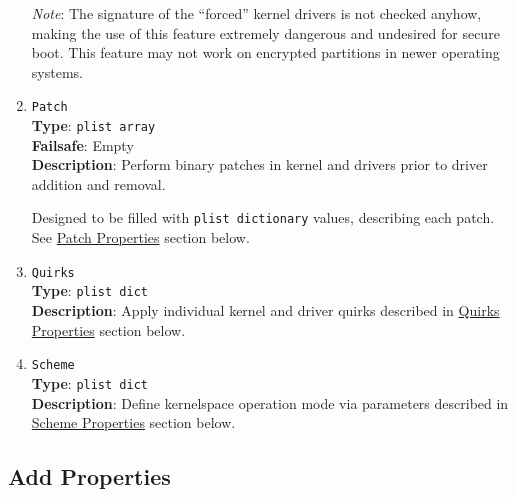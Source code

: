 \documentclass[]{article}
\begin{document}
\begin{enumerate}
  \emph{Note}: The signature of the ``forced'' kernel drivers is not checked anyhow,
  making the use of this feature extremely dangerous and undesired for secure boot.
  This feature may not work on encrypted partitions in newer operating systems.

\item
  \texttt{Patch}\\
  \textbf{Type}: \texttt{plist\ array}\\
  \textbf{Failsafe}: Empty\\
  \textbf{Description}: Perform binary patches in kernel and drivers prior to
  driver addition and removal.

  Designed to be filled with \texttt{plist\ dictionary} values, describing each
  patch. See \hyperref[kernelpropspatch]{Patch Properties} section below.

\item
  \texttt{Quirks}\\
  \textbf{Type}: \texttt{plist\ dict}\\
  \textbf{Description}: Apply individual kernel and driver quirks described
  in \hyperref[kernelpropsquirks]{Quirks Properties} section below.

\item
  \texttt{Scheme}\\
  \textbf{Type}: \texttt{plist\ dict}\\
  \textbf{Description}: Define kernelspace operation mode via parameters
  described in \hyperref[kernelpropsscheme]{Scheme Properties} section below.


\end{enumerate}

\subsection{Add Properties}\label{kernelpropsadd}
\end{document}
